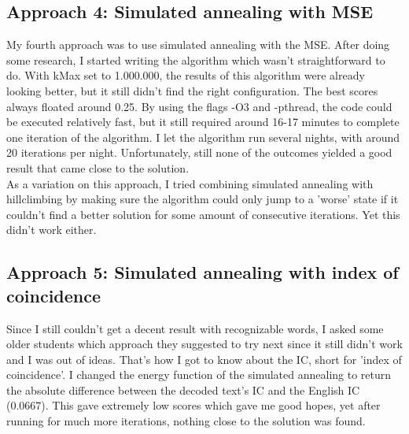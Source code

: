 \documentclass{article}
\begin{document}
\subsection{Approach 4: Simulated annealing with MSE}
My fourth approach was to use simulated annealing with the MSE. After doing some research, I started writing the algorithm which wasn't straightforward to do. With kMax set to 1.000.000, the results of this algorithm were already looking better, but it still didn't find the right configuration. The best scores always floated around 0.25. By using the flags -O3 and -pthread, the code could be executed relatively fast, but it still required around 16-17 minutes to complete one iteration of the algorithm. I let the algorithm run several nights, with around 20 iterations per night. Unfortunately, still none of the outcomes yielded a good result that came close to the solution.\\

\noindent As a variation on this approach, I tried combining simulated annealing with hillclimbing by making sure the algorithm could only jump to a 'worse' state if it couldn't find a better solution for some amount of consecutive iterations. Yet this didn't work either.

\subsection{Approach 5: Simulated annealing with index of coincidence}
Since I still couldn't get a decent result with recognizable words, I asked some older students which approach they suggested to try next since it still didn't work and I was out of ideas. That's how I got to know about the IC, short for 'index of coincidence'. I changed the energy function of the simulated annealing to return the absolute difference between the decoded text's IC and the English IC (0.0667). This gave extremely low scores which gave me good hopes, yet after running for much more iterations, nothing close to the solution was found.
\end{document}
